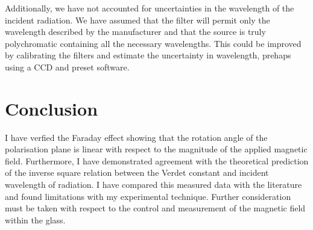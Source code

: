 \documentclass{article}%
\begin{document}
Additionally, we have not accounted for uncertainties in the wavelength of the incident radiation. We have assumed that the filter will permit only the wavelength described by the manufacturer and that the source is truly polychromatic containing all the necessary wavelengths. This could be improved by calibrating the filters and estimate the uncertainty in wavelength, prehaps using a CCD and preset software.

\section{Conclusion}

I have verfied the Faraday effect showing that the rotation angle of the polarisation plane is linear with respect to the magnitude of the applied magnetic field.
Furthermore, I have demonstrated agreement with the theoretical prediction of the inverse square relation between the Verdet constant and incident wavelength of radiation. I have compared this measured data with the literature and found limitations with my experimental technique.
Further consideration must be taken with respect to the control and measurement of the magnetic field within the glass.
\printbibliography
\end{document}
